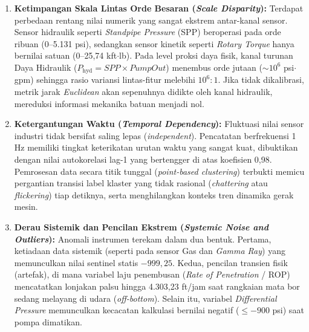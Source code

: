 \documentclass[conference]{IEEEtran}
\begin{document}
\begin{enumerate}
\item \textbf{Ketimpangan Skala Lintas Orde Besaran (\textit{Scale Disparity}):} Terdapat perbedaan rentang nilai numerik yang sangat ekstrem antar-kanal sensor. Sensor hidraulik seperti \textit{Standpipe Pressure} (SPP) beroperasi pada orde ribuan (0--5.131 psi), sedangkan sensor kinetik seperti \textit{Rotary Torque} hanya bernilai satuan (0--25,74 kft$\cdot$lb). Pada level proksi daya fisik, kanal turunan Daya Hidraulik ($P_{\text{hyd}} = SPP \times PumpOut$) menembus orde jutaan ($\sim 10^6$ psi$\cdot$gpm) sehingga rasio variansi lintas-fitur melebihi $10^6 : 1$. Jika tidak dikalibrasi, metrik jarak \textit{Euclidean} akan sepenuhnya didikte oleh kanal hidraulik, mereduksi informasi mekanika batuan menjadi nol.

\item \textbf{Ketergantungan Waktu (\textit{Temporal Dependency}):} Fluktuasi nilai sensor industri tidak bersifat saling lepas (\textit{independent}). Pencatatan berfrekuensi 1 Hz memiliki tingkat keterikatan urutan waktu yang sangat kuat, dibuktikan dengan nilai autokorelasi lag-1 yang bertengger di atas koefisien 0{,}98. Pemrosesan data secara titik tunggal (\textit{point-based clustering}) terbukti memicu pergantian transisi label klaster yang tidak rasional (\textit{chattering} atau \textit{flickering}) tiap detiknya, serta menghilangkan konteks tren dinamika gerak mesin.

\item \textbf{Derau Sistemik dan Pencilan Ekstrem (\textit{Systemic Noise and Outliers}):} Anomali instrumen terekam dalam dua bentuk. Pertama, ketiadaan data sistemik (seperti pada sensor Gas dan \textit{Gamma Ray}) yang memunculkan nilai sentinel statis $-999{,}25$. Kedua, pencilan transien fisik (artefak), di mana variabel laju penembusan (\textit{Rate of Penetration} / ROP) mencatatkan lonjakan palsu hingga 4.303,23 ft/jam saat rangkaian mata bor sedang melayang di udara (\textit{off-bottom}). Selain itu, variabel \textit{Differential Pressure} memunculkan kecacatan kalkulasi bernilai negatif ($\le -900$ psi) saat pompa dimatikan.
\end{enumerate}
\end{document}
